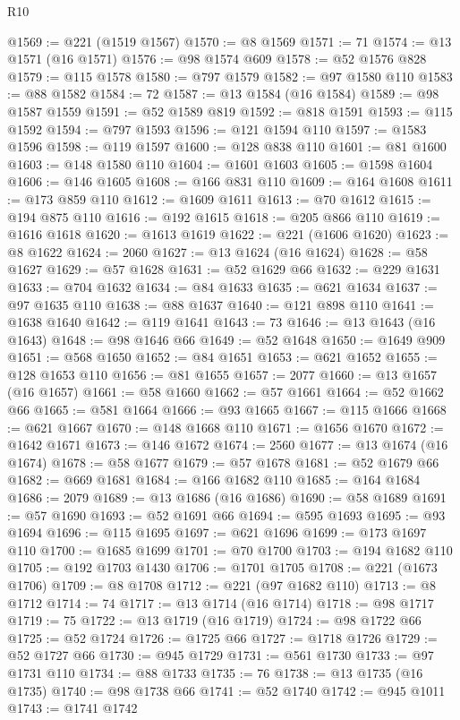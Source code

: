 \begin{lexlean}{R10}
\begin{coremodule}
@1569 := @221 (@1519 @1567)
@1570 := @8 @1569
@1571 := 71
@1574 := @13 @1571 (@16 @1571)
@1576 := @98 @1574 @609
@1578 := @52 @1576 @828
@1579 := @115 @1578
@1580 := @797 @1579
@1582 := @97 @1580 @110
@1583 := @88 @1582
@1584 := 72
@1587 := @13 @1584 (@16 @1584)
@1589 := @98 @1587 @1559
@1591 := @52 @1589 @819
@1592 := @818 @1591
@1593 := @115 @1592
@1594 := @797 @1593
@1596 := @121 @1594 @110
@1597 := @1583 @1596
@1598 := @119 @1597
@1600 := @128 @838 @110
@1601 := @81 @1600
@1603 := @148 @1580 @110
@1604 := @1601 @1603
@1605 := @1598 @1604
@1606 := @146 @1605
@1608 := @166 @831 @110
@1609 := @164 @1608
@1611 := @173 @859 @110
@1612 := @1609 @1611
@1613 := @70 @1612
@1615 := @194 @875 @110
@1616 := @192 @1615
@1618 := @205 @866 @110
@1619 := @1616 @1618
@1620 := @1613 @1619
@1622 := @221 (@1606 @1620)
@1623 := @8 @1622
@1624 := 2060
@1627 := @13 @1624 (@16 @1624)
@1628 := @58 @1627
@1629 := @57 @1628
@1631 := @52 @1629 @66
@1632 := @229 @1631
@1633 := @704 @1632
@1634 := @84 @1633
@1635 := @621 @1634
@1637 := @97 @1635 @110
@1638 := @88 @1637
@1640 := @121 @898 @110
@1641 := @1638 @1640
@1642 := @119 @1641
@1643 := 73
@1646 := @13 @1643 (@16 @1643)
@1648 := @98 @1646 @66
@1649 := @52 @1648
@1650 := @1649 @909
@1651 := @568 @1650
@1652 := @84 @1651
@1653 := @621 @1652
@1655 := @128 @1653 @110
@1656 := @81 @1655
@1657 := 2077
@1660 := @13 @1657 (@16 @1657)
@1661 := @58 @1660
@1662 := @57 @1661
@1664 := @52 @1662 @66
@1665 := @581 @1664
@1666 := @93 @1665
@1667 := @115 @1666
@1668 := @621 @1667
@1670 := @148 @1668 @110
@1671 := @1656 @1670
@1672 := @1642 @1671
@1673 := @146 @1672
@1674 := 2560
@1677 := @13 @1674 (@16 @1674)
@1678 := @58 @1677
@1679 := @57 @1678
@1681 := @52 @1679 @66
@1682 := @669 @1681
@1684 := @166 @1682 @110
@1685 := @164 @1684
@1686 := 2079
@1689 := @13 @1686 (@16 @1686)
@1690 := @58 @1689
@1691 := @57 @1690
@1693 := @52 @1691 @66
@1694 := @595 @1693
@1695 := @93 @1694
@1696 := @115 @1695
@1697 := @621 @1696
@1699 := @173 @1697 @110
@1700 := @1685 @1699
@1701 := @70 @1700
@1703 := @194 @1682 @110
@1705 := @192 @1703 @1430
@1706 := @1701 @1705
@1708 := @221 (@1673 @1706)
@1709 := @8 @1708
@1712 := @221 (@97 @1682 @110)
@1713 := @8 @1712
@1714 := 74
@1717 := @13 @1714 (@16 @1714)
@1718 := @98 @1717
@1719 := 75
@1722 := @13 @1719 (@16 @1719)
@1724 := @98 @1722 @66
@1725 := @52 @1724
@1726 := @1725 @66
@1727 := @1718 @1726
@1729 := @52 @1727 @66
@1730 := @945 @1729
@1731 := @561 @1730
@1733 := @97 @1731 @110
@1734 := @88 @1733
@1735 := 76
@1738 := @13 @1735 (@16 @1735)
@1740 := @98 @1738 @66
@1741 := @52 @1740
@1742 := @945 @1011
@1743 := @1741 @1742

\end{coremodule}
\end{lexlean}
